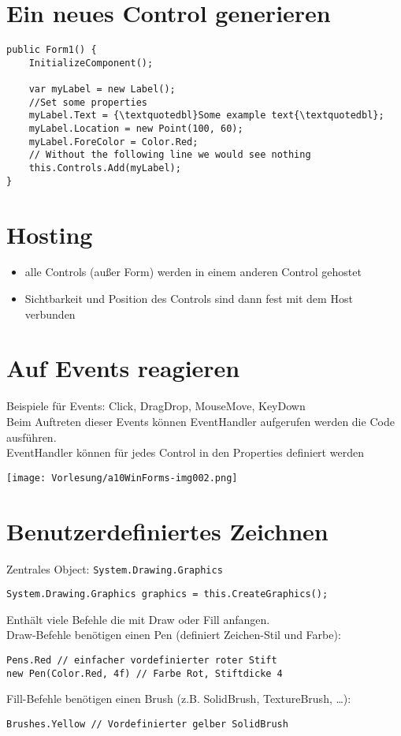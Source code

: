 \section{Ein neues Control generieren}

\begin{lstlisting}[language={[Sharp]C}]
public Form1() {
	InitializeComponent();

	var myLabel = new Label();
	//Set some properties
	myLabel.Text = {\textquotedbl}Some example text{\textquotedbl};
	myLabel.Location = new Point(100, 60);
	myLabel.ForeColor = Color.Red;
	// Without the following line we would see nothing
	this.Controls.Add(myLabel);
}
\end{lstlisting}

\section{Hosting}

\begin{itemize}
\item alle Controls (außer Form) werden in einem anderen Control gehostet
\item Sichtbarkeit und Position des Controls sind dann fest mit dem Host verbunden
\end{itemize}

\section{Auf Events reagieren}
Beispiele für Events: Click, DragDrop, MouseMove, KeyDown\\
Beim Auftreten dieser Events können EventHandler aufgerufen werden die Code ausführen. \\
EventHandler können für jedes Control in den Properties definiert werden

\begin{center}
\texttt{[image: Vorlesung/a10WinForms-img002.png]} 
\end{center}

\section{Benutzerdefiniertes Zeichnen}

Zentrales Object: \lstinline$System.Drawing.Graphics$
\begin{lstlisting}[language={[Sharp]C}]
System.Drawing.Graphics graphics = this.CreateGraphics();
\end{lstlisting}
Enthält viele Befehle die mit Draw oder Fill anfangen.\bigskip\\
Draw-Befehle benötigen einen Pen (definiert Zeichen-Stil und Farbe):
\begin{lstlisting}[language={[Sharp]C}]
Pens.Red // einfacher vordefinierter roter Stift
new Pen(Color.Red, 4f) // Farbe Rot, Stiftdicke 4
\end{lstlisting}\bigskip
Fill-Befehle benötigen einen Brush (z.B. SolidBrush, TextureBrush, …):
\begin{lstlisting}[language={[Sharp]C}]
Brushes.Yellow // Vordefinierter gelber SolidBrush
\end{lstlisting}

